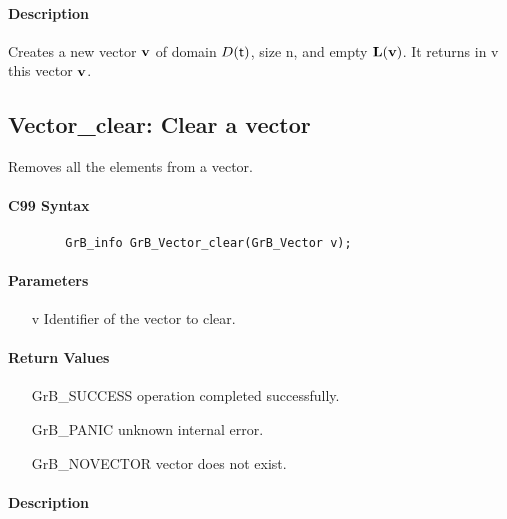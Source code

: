 \paragraph{Description}

Creates a new vector ${\bf v}$ of domain $D({\sf t})$, size {\sf n}, and
empty $\bold{L}({\bf v})$. It returns in {\sf v} this vector ${\bf v}$.

\subsection{{\sf Vector\_clear}: Clear a vector}

Removes all the elements from a vector.

\paragraph{C99 Syntax}

\begin{verbatim}
        GrB_info GrB_Vector_clear(GrB_Vector v);
\end{verbatim}

\paragraph{Parameters}

\begin{itemize}[leftmargin=1.1in]
    \item[{\sf v}] Identifier of the vector to clear.
\end{itemize}

\paragraph{Return Values}

\begin{itemize}[leftmargin=2.1in]
\item[{\sf GrB\_SUCCESS}]   operation completed successfully.
\item[{\sf GrB\_PANIC}]     unknown internal error.
\item[{\sf GrB\_NOVECTOR}]  vector does not exist.
\end{itemize}

\paragraph{Description}


